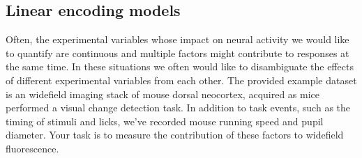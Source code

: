 \documentclass[a4paper]{report}
\begin{document}
\subsection{Linear encoding models}
Often, the experimental variables whose impact on neural activity we would like to quantify are continuous and multiple factors might contribute to responses at the same time. 
In these situations we often would like to disambiguate the effects of different experimental variables from each other. 
The provided example dataset is an widefield imaging stack of mouse dorsal neocortex, acquired as mice performed a visual change detection task.
In addition to task events, such as the timing of stimuli and licks, we've recorded mouse running speed and pupil diameter. 
Your task is to measure the contribution of these factors to widefield fluorescence.
\end{document}
